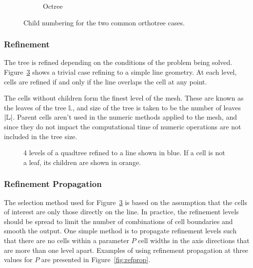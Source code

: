 \documentclass[twoside]{IIBproject}
\numberwithin{figure}{section}
\begin{document}
\begin{figure} [H]
\begin{subfigure}[b]{.3\textwidth}
                    \caption{Octree}
                    \label{fig:childnum-3d}
                \end{subfigure}%
                \caption{Child numbering for the two common orthotree cases.}
                \label{fig:childnum}
            \end{figure}



        \subsubsection{Refinement} %
            \label{sec:orthotree-refine}

            The tree is refined depending on the conditions of the problem being solved. Figure~\ref{fig:layeredtree} shows a trivial case refining to a simple line geometry. At each level, cells are refined if and only if the line overlaps the cell at any point. 

            The cells without children form the finest level of the mesh. These are known as the leaves of the tree $\mathbb{L}$, and size of the tree is taken to be the number of leaves $\abs{\mathbb{L}}$. Parent cells aren't used in the numeric methods applied to the mesh, and since they do not impact the computational time of numeric operations are not included in the tree size. 

            \begin{figure} [htb]
                
                \caption{4 levels of a quadtree refined to a line shown in blue. If a cell is not a leaf, its children are shown in orange.}
                \label{fig:layeredtree}
            \end{figure}



        \subsubsection{Refinement Propagation} %
            \label{sec:orthotree-refprop}

            The selection method used for Figure~\ref{fig:layeredtree} is based on the assumption that the cells of interest are only those directly on the line. In practice, the refinement levels should be spread to limit the number of combinations of cell boundaries and smooth the output. One simple method is to propagate refinement levels such that there are no cells within a parameter $P$ cell widths in the axis directions that are more than one level apart. Examples of using refinement propagation at three values for $P$ are presented in Figure~\ref{fig:refprop}.
\end{document}

